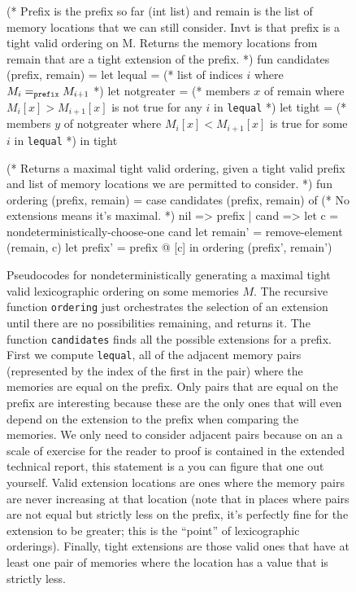 \documentclass[twocolumn]{article}
\begin{document}
\begin{figure}[htp]
  \begin{code}
    (* Prefix is the prefix so far (int list)
       and remain is the list of memory locations
       that we can still consider. Invt is that
       prefix is a tight valid ordering on M. Returns
       the memory locations from remain that are
       a tight extension of the prefix. *)
    fun candidates (prefix, remain) =
      let lequal = (* list of indices $i$ where
                      $M_i =_{\tt prefix} M_{i+1}$ *)
      let notgreater = (* members $x$ of remain where
                          $M_i[x] > M_{i + 1}[x]$ is
                          not true for any $i$ in
                          {\tt lequal} *)
      let tight = (* members $y$ of notgreater where
                     $M_i[x] < M_{i + 1}[x]$ is true
                     for some $i$ in {\tt lequal} *)
      in tight
                          
    (* Returns a maximal tight valid ordering, given
       a tight valid prefix and list of memory locations
       we are permitted to consider. *)
    fun ordering (prefix, remain) =
      case candidates (prefix, remain) of
        (* No extensions means it's maximal. *)
        nil => prefix
      | cand =>
        let c = nondeterministically-choose-one cand
        let remain' = remove-element (remain, c)
        let prefix' = prefix @ [c]
        in ordering (prefix', remain')
  \end{code}

  \caption{Pseudocodes for nondeterministically generating a maximal
    tight valid lexicographic ordering on some memories $M$. The
    recursive function {\tt ordering} just orchestrates the selection
    of an extension until there are no possibilities remaining, and
    returns it. The function {\tt candidates} finds all the possible
    extensions for a prefix. First we compute {\tt lequal}, all of the
    adjacent memory pairs (represented by the index of the first in
    the pair) where the memories are equal on the prefix. Only pairs
    that are equal on the prefix are interesting because these are the
    only ones that will even depend on the extension to the prefix
    when comparing the memories. We only need to consider adjacent
    pairs because on an a scale of exercise for the reader to proof is
    contained in the extended technical report, this statement is a
    you can figure that one out yourself. Valid extension locations
    are ones where the memory pairs are never increasing at that
    location (note that in places where pairs are not equal but
    strictly less on the prefix, it's perfectly fine for the extension
    to be greater; this is the ``point'' of lexicographic orderings).
    Finally, tight extensions are those valid ones that have at least
    one pair of memories where the location has a value that is
    strictly less.}
  \label{fig:ordering}
\end{figure}
\end{document}
